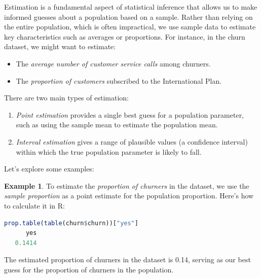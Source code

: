 \documentclass[
]{book}
\providecommand{\tightlist}{%
  \setlength{\itemsep}{0pt}\setlength{\parskip}{0pt}}
\theoremstyle{definition}
\theoremstyle{definition}
\newtheorem{example}{Example}[chapter]
\theoremstyle{definition}
\theoremstyle{definition}
\theoremstyle{remark}
\begin{document}
Estimation is a fundamental aspect of statistical inference that allows us to make informed guesses about a population based on a sample. Rather than relying on the entire population, which is often impractical, we use sample data to estimate key characteristics such as averages or proportions. For instance, in the churn dataset, we might want to estimate:

\begin{itemize}
\tightlist
\item
  The \emph{average number of customer service calls} among churners.\\
\item
  The \emph{proportion of customers} subscribed to the International Plan.
\end{itemize}

There are two main types of estimation:

\begin{enumerate}
\def\labelenumi{\arabic{enumi}.}
\tightlist
\item
  \emph{Point estimation} provides a single best guess for a population parameter, such as using the sample mean to estimate the population mean.\\
\item
  \emph{Interval estimation} gives a range of plausible values (a confidence interval) within which the true population parameter is likely to fall.
\end{enumerate}

Let's explore some examples:

\begin{example}
\protect\hypertarget{exm:ex-est-churn-proportion}{}\label{exm:ex-est-churn-proportion}To estimate the \emph{proportion of churners} in the dataset, we use the \emph{sample proportion} as a point estimate for the population proportion. Here's how to calculate it in R:

\begin{lstlisting}[language=R]
prop.table(table(churn$churn))["yes"]
      yes 
   0.1414
\end{lstlisting}

The estimated proportion of churners in the dataset is 0.14, serving as our best guess for the proportion of churners in the population.
\end{example}
\end{document}
